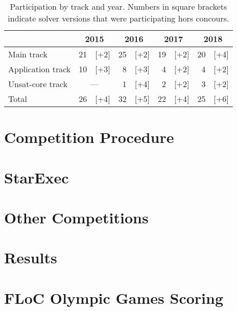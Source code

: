 \documentclass[twoside,11pt]{article}
\begin{document}
\begin{table}
  \caption{Participation by track and year.  Numbers in square
    brackets indicate solver versions that were participating hors
    concours.}
  \label{table:participation-by-track}
  \centering
  \begin{tabular}{|l|r@{\,\,}r|r@{\,\,}r|r@{\,\,}r|r@{\,\,}r|}
    \hline
                      & \multicolumn{2}{c|}{2015} & \multicolumn{2}{c|}{2016} & \multicolumn{2}{c|}{2017} & \multicolumn{2}{c|}{2018} \\
    \hline
    Main track        & 21 &                [+2] & 25 & [+2] & 19 & [+2] & 20 & [+4] \\
    Application track & 10 &                [+3] &  8 & [+3] &  4 & [+2] &  4 & [+2] \\
    Unsat-core track  & \multicolumn{2}{c|}{---} &  1 & [+4] &  2 & [+2] &  3 & [+2] \\
    \hline
    Total             & 26 &                [+4] & 32 & [+5] & 22 & [+4] & 25 & [+6] \\
    \hline
  \end{tabular}
\end{table}






\section{Competition Procedure}
\label{sec:procedure}

\section{StarExec}
\label{sec:starexec}

\section{Other Competitions}
\label{sec:OtherCompetitions}

\section{Results}
\label{sec:results}

\section{FLoC Olympic Games Scoring}
\label{sec:floc}

\end{document}
